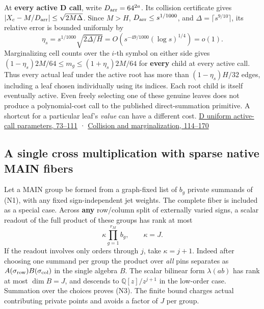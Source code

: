 \documentclass[
  11pt,
]{article}
\begin{document}
At \textbf{every active D call}, write \(D_{\rm arr}=64^{2a}\). Its
collision certificate gives
\(\lvert X_c-M/D_{\rm arr}\rvert\le\sqrt{2M\Delta}\). Since \(M>H\),
\(D_{\rm arr}\le s^{1/1000}\), and \(\Delta=\lceil s^{9/10}\rceil\), its
relative error is bounded uniformly by \[
 \eta_s=s^{1/1000}\sqrt{2\Delta/H}
         =O(s^{-49/1000}(\log s)^{1/4})=o(1).
\] Marginalizing cell counts over the \(i\)-th symbol on either side
gives \((1-\eta_s)2M/64\le m_g\le(1+\eta_s)2M/64\) for \textbf{every}
child at every active call. Thus every actual leaf under the active root
has more than \((1-\eta_s)H/32\) edges, including a leaf chosen
individually using its indices. Each root child is itself eventually
active. Even freely selecting one of these genuine leaves does not
produce a polynomial-cost call to the published direct-summation
primitive. A shortcut for a particular leaf's \emph{value} can have a
different cost.
\href{https://github.com/openai/math/blob/main/preprints/The-Exponential-Time-Hypothesis-is-False-October-25-2026/build/quantitative-contraction.tex\#L73}{D
uniform active-call parameters, 73--111} ·
\href{https://github.com/openai/math/blob/main/preprints/The-Exponential-Time-Hypothesis-is-False-October-25-2026/build/quantitative-contraction.tex\#L114}{Collision
and marginalization, 114--170}

\subsection{A single cross multiplication with sparse native MAIN
fibers}\label{v8-a-single-cross-multiplication-with-sparse-native-main-fibers}

Let a MAIN group be formed from a graph-fixed list of \(b_g\) private
summands of (N1), with any fixed sign-independent jet weights. The
complete fiber is included as a special case. Across \textbf{any}
row/column split of externally varied signs, a scalar readout of the
full product of these groups has rank at most \[
 \kappa\prod_{g=1}^{r_M} b_g,\qquad
 \kappa=J.
\tag{N3}
\] If the readout involves only orders through \(j\), take
\(\kappa=j+1\). Indeed after choosing one summand per group the product
over \emph{all} pins separates as
\(A(\sigma_{\rm row})B(\sigma_{\rm col})\) in the single algebra \(B\).
The scalar bilinear form \(\lambda(ab)\) has rank at most \(\dim B=J\),
and descends to \(\mathbb Q[z]/z^{j+1}\) in the low-order case.
Summation over the choices proves (N3). The finite bound charges actual
contributing private points and avoids a factor of \(J\) per group.
\end{document}
